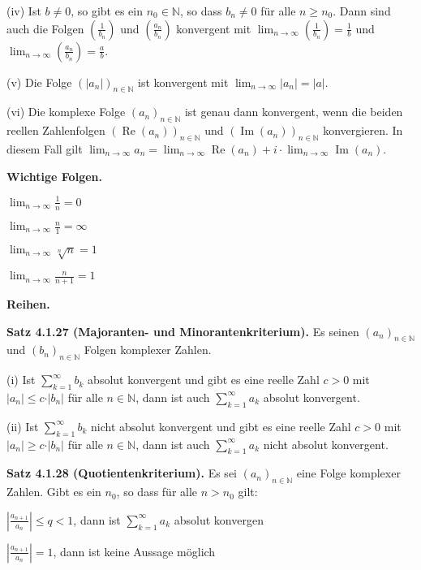 (iv) Ist $b \neq 0$, so gibt es ein $n_0 \in \mathbb N$, so dass $b_n \neq 0$ für alle $n \geq n_0$. Dann sind auch die Folgen $(\frac{1}{b_n})$ und $(\frac{a_n}{b_n})$ konvergent mit $\lim_{n\rightarrow \infty } (\frac{1}{b_n}) = \frac{1}{b}$ und $\lim_{n\rightarrow \infty } (\frac{a_n}{b_n}) = \frac{a}{b}$.

(v) Die Folge $(\vert a_n \vert )_{n \in \mathbb N}$ ist konvergent mit $\lim_{n \rightarrow \infty } \vert a_n \vert = \vert a \vert$.

(vi) Die komplexe Folge $(a_n)_{n \in \mathbb N}$ ist genau dann konvergent, wenn die beiden reellen Zahlenfolgen $(\operatorname{Re} (a_n))_{n \in \mathbb N}$ und $(\operatorname{Im} (a_n))_{n \in \mathbb N}$ konvergieren. In diesem Fall gilt $\lim_{n \rightarrow \infty} a_n = \lim_{n \rightarrow \infty} \operatorname{Re} (a_n) + i \cdot \lim_{n \rightarrow \infty} \operatorname{Im} (a_n)$.

\textbf{Wichtige Folgen.}

$\lim_{n \rightarrow \infty} \frac{1}{n} = 0$

$\lim_{n \rightarrow \infty} \frac{n}{1} = \infty$

$\lim_{n \rightarrow \infty} \sqrt[n]{n} = 1$

$\lim_{n \rightarrow \infty} \frac{n}{n+1} = 1$

\textbf{Reihen.}

\textbf{Satz 4.1.27 (Majoranten- und Minorantenkriterium).} Es seinen $(a_n)_{n \in \mathbb N}$ und $(b_n)_{n \in \mathbb N}$ Folgen komplexer Zahlen.

(i) Ist $\sum_{k=1}^\infty b_k$ absolut konvergent und gibt es eine reelle Zahl $c > 0$ mit $\vert a_n\vert \leq c \cdot \vert b_n \vert$ für alle $n \in \mathbb N$, dann ist auch $\sum_{k=1}^\infty a_k$ absolut konvergent.

(ii) Ist $\sum_{k=1}^\infty b_k$ nicht absolut konvergent und gibt es eine reelle Zahl $c > 0$ mit $\vert a_n\vert \geq c \cdot \vert b_n \vert$ für alle $n \in \mathbb N$, dann ist auch $\sum_{k=1}^\infty a_k$ nicht absolut konvergent.

\textbf{Satz 4.1.28 (Quotientenkriterium).} Es sei $(a_n)_{n\in \mathbb N}$ eine Folge komplexer Zahlen. Gibt es ein $n_0$, so dass für alle $n>n_0$ gilt:

$\left|\frac{a_{n+1}}{a_n}\right| \le q<1$, dann ist $\sum_{k=1}^\infty a_k$ absolut konvergen

$\left|\frac{a_{n+1}}{a_n}\right| = 1$, dann ist keine Aussage möglich

